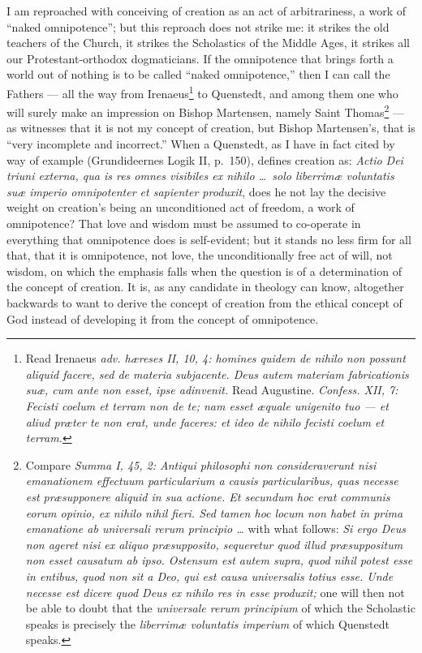 \documentclass[12pt]{book}
\newcommand{\opage}[1]{\marginnote{\footnotesize\textit{[#1]}}}
\begin{document}
I am reproached with conceiving of creation as an act of arbitrariness, a work of ``naked omnipotence''; but this reproach does not strike me: it strikes the old teachers of the Church, it strikes the Scholastics of the Middle Ages, it strikes all our Protestant-orthodox dogmaticians. If
\opage{102}\setcounter{footnote}{0}%
the omnipotence that brings forth a world out of nothing is to be called ``naked omnipotence,'' then I can call the Fathers --- all the way from Irenaeus\footnote{Read Irenaeus \textit{adv. hæreses II, 10, 4: homines quidem de nihilo non possunt aliquid facere, sed de materia subjacente. Deus autem materiam fabricationis suæ, cum ante non esset, ipse adinvenit.} Read Augustine. \textit{Confess. XII, 7: Fecisti coelum et terram non de te; nam esset æquale unigenito tuo --- et aliud præter te non erat, unde faceres: et ideo de nihilo fecisti coelum et terram.}} to Quenstedt, and among them one who will surely make an impression on Bishop Martensen, namely Saint Thomas\footnote{Compare \textit{Summa I, 45, 2: Antiqui philosophi non consideraverunt nisi emanationem effectuum particularium a causis particularibus, quas necesse est præsupponere aliquid in sua actione. Et secundum hoc erat communis eorum opinio, ex nihilo nihil fieri. Sed tamen hoc locum non habet in prima emanatione ab universali rerum principio \dots} with what follows: \textit{Si ergo Deus non ageret nisi ex aliquo præsupposito, sequeretur quod illud præsuppositum non esset causatum ab ipso. Ostensum est autem supra, quod nihil potest esse in entibus, quod non sit a Deo, qui est causa universalis totius esse. Unde necesse est dicere quod Deus ex nihilo res in esse produxit;} one will then not be able to doubt that the \textit{universale rerum principium} of which the Scholastic speaks is precisely the \textit{liberrimæ voluntatis imperium} of which Quenstedt speaks.} --- as witnesses that it is not my concept of creation, but Bishop Martensen's, that is ``very incomplete and incorrect.'' When a Quenstedt, as I have in fact cited by way of example (Grundideernes Logik II, p.~150), defines creation as: \textit{Actio Dei triuni externa, qua is res omnes visibiles ex nihilo \dots\ solo liberrimæ voluntatis suæ imperio omnipotenter et sapienter produxit}, does he not lay the decisive weight on creation's being an unconditioned act of freedom, a work of omnipotence? That love and wisdom must be assumed to co-operate in everything
\opage{103}\setcounter{footnote}{0}%
that omnipotence does is self-evident; but it stands no less firm for all that, that it is omnipotence, not love, the unconditionally free act of will, not wisdom, on which the emphasis falls when the question is of a determination of the concept of creation. It is, as any candidate in theology can know, altogether backwards to want to derive the concept of creation from the ethical concept of God instead of developing it from the concept of omnipotence.
\end{document}
